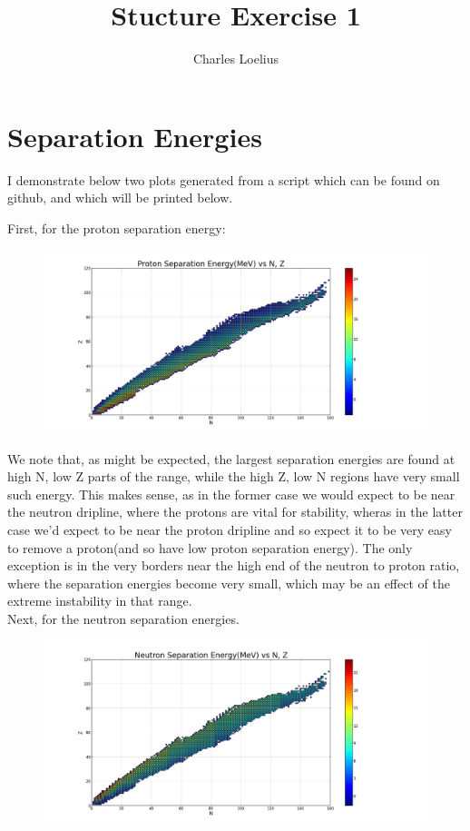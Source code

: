 \documentclass[11pt]{article} %
\title{Stucture Exercise 1}
\author{Charles Loelius}
\begin{document}
\maketitle

\section{Separation Energies}

I demonstrate below two plots generated from a script which can be found on github, and which will be printed below.

First, for the proton separation energy:\\
\vspace{1mm}
\begin{figure}[h]
\centering
\includegraphics[width=\linewidth]{"ProtonSepEnergy"}
\end{figure}

We note that, as might be expected, the largest separation energies are found at high N, low Z parts of the range, while the high Z, low N regions have very small such energy. This makes sense, as in the former case we would expect to be near the neutron dripline, where the protons are vital for stability, wheras in the latter case we'd expect to be near the proton dripline and so expect it to be very easy to remove a proton(and so have low proton separation energy). The only exception is in the very borders near the high end of the neutron to proton ratio, where the separation energies become very small, which may be an effect of the extreme instability in that range.\\
\newpage
Next, for the neutron separation energies.\\
\begin{figure}[h]
\centering
\includegraphics[width=\linewidth]{"NeutronSepEnergy"}
\end{figure}
\end{document}
